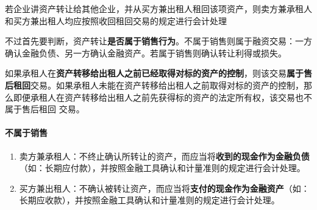 \documentclass[UTF8,12pt]{ctexart}
\numberwithin{equation}{section} %
\numberwithin{figure}{section}
\numberwithin{table}{section}
\begin{document}
	若企业讲资产转让给其他企业，并从买方兼出租人租回该项资产，则卖方兼承租人和买方兼出租人均应按照收回租回交易的规定进行会计处理
	
	不过首先要判断，资产转让\textbf{是否属于销售行为}。不属于销售则属于融资交易：一方确认金融负债、另一方确认金融资产。若属于销售则确认转让利得或损失。
	
	如果承租人在\textbf{资产转移给出租人之前已经取得对标的资产的控制}，则该交易\textbf{属于售后租回}交易。如果承租人未能在资产转移给出租人之前取得对标的资产的控制，那么即便承租人在资产转移给出租人之前先获得标的资产的法定所有权，该交易也不属于售后租回  交易。
	
	\paragraph{不属于销售}
	\begin{enumerate}
		\item 卖方兼承租人：不终止确认所转让的资产，而应当将\textbf{收到的现金作为金融负债}（如：长期应付款），并按照金融工具确认和计量准则的规定进行会计处理。
	
		\item 买方兼出租人：不确认被转让资产，而应当将\textbf{支付的现金作为金融资产}（如：长期应收款），并按照金融工具确认和计量准则的规定进行会计处理。
	\end{enumerate}
	
\end{document}
